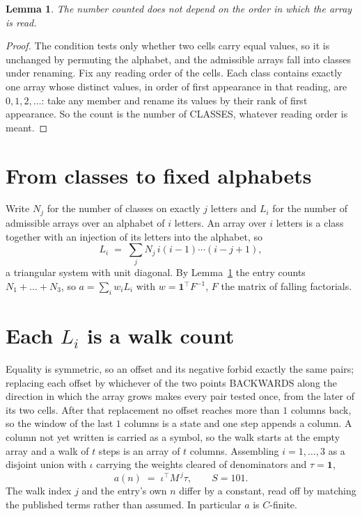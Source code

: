 \documentclass[11pt,a4paper]{article}
\theoremstyle{plain}
\newtheorem{lemma}[theorem]{Lemma}
\theoremstyle{definition}
\begin{document}
\begin{lemma}\label{lem:order}
The number counted does not depend on the order in which the array is read.
\end{lemma}

\begin{proof}
The condition tests only whether two cells carry equal values, so it is unchanged by permuting
the alphabet, and the admissible arrays fall into classes under renaming. Fix any reading order
of the cells. Each class contains exactly one array whose distinct values, in order of first
appearance in that reading, are $0,1,2,\dots$: take any member and rename its values by their
rank of first appearance. So the count is the number of CLASSES, whatever reading order is
meant.
\end{proof}

\section{From classes to fixed alphabets}

Write $N_j$ for the number of classes on exactly $j$ letters and $L_i$ for the number of
admissible arrays over an alphabet of $i$ letters. An array over $i$ letters is a class together
with an injection of its letters into the alphabet, so
\[
L_i\;=\;\sum_j N_j\,i(i-1)\cdots(i-j+1),
\]
a triangular system with unit diagonal. By Lemma~\ref{lem:order} the entry counts
$N_1+\dots+N_{3}$, so $a=\sum_i w_iL_i$ with $w=\mathbf{1}^{\!\top}F^{-1}$, $F$ the
matrix of falling factorials.

\section{Each $L_i$ is a walk count}

Equality is symmetric, so an offset and its negative forbid exactly the same pairs; replacing
each offset by whichever of the two points BACKWARDS along the direction in which the array
grows makes every pair tested once, from the later of its two cells. After that replacement no
offset reaches more than $1$ columns back, so the window of the last $1$
columns is a state and one step appends a column. A column not yet written is
carried as a symbol, so the walk starts at the empty array and a walk of $t$ steps is an array
of $t$ columns. Assembling $i=1,\dots,3$ as a disjoint union with $\iota$ carrying the
weights cleared of denominators and $\tau=\mathbf{1}$,
\[
a(n)\;=\;\iota^{\!\top}M^{\,j}\tau ,\qquad S=101.
\]
The walk index $j$ and the entry's own $n$ differ by a constant, read off by matching the
published terms rather than assumed. In particular $a$ is $C$-finite.
\end{document}
